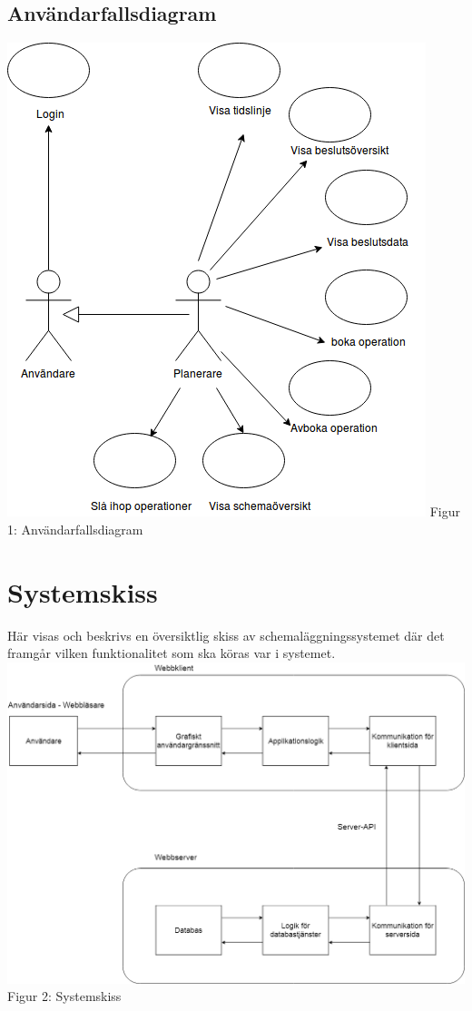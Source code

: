 \documentclass[a4paper,10pt]{article}
\begin{document}
\subsection{Användarfallsdiagram}
\includegraphics[width=\textwidth,height=\textheight,keepaspectratio]{Usecasediagram.png}
Figur 1: Användarfallsdiagram
\clearpage
\section{Systemskiss}
\label{sec:Systemskiss}
Här visas och beskrivs en översiktlig skiss av schemaläggningssystemet där det framgår vilken funktionalitet som ska köras var i systemet. \\
\includegraphics[width=\textwidth,height=.7\textheight]{Systemskiss.png}\\
Figur 2: Systemskiss
\end{document}
